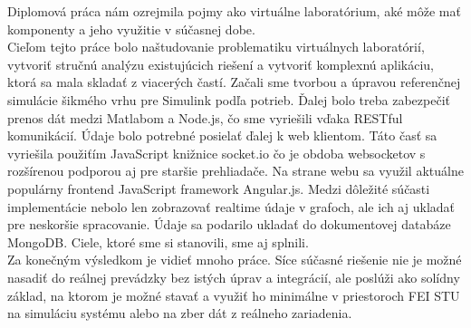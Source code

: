 \indent Diplomová práca nám ozrejmila pojmy ako virtuálne laboratórium, aké môže mať komponenty a jeho využitie v súčasnej dobe.\\
\indent Cieľom tejto práce bolo naštudovanie problematiku virtuálnych laboratórií, vytvoriť stručnú analýzu existujúcich riešení a vytvoriť komplexnú aplikáciu, ktorá sa mala skladať z viacerých častí. Začali sme tvorbou a úpravou referenčnej simulácie šikmého vrhu pre Simulink podľa potrieb. Ďalej bolo treba zabezpečiť prenos dát medzi Matlabom a Node.js, čo sme vyriešili vďaka RESTful komunikácií. Údaje bolo potrebné posielať ďalej k web klientom. Táto časť sa vyriešila použiťím JavaScript knižnice socket.io čo je obdoba websocketov s rozšírenou podporou aj pre staršie prehliadače. Na strane webu sa využil aktuálne populárny frontend JavaScript framework Angular.js. Medzi dôležité súčasti implementácie nebolo len zobrazovať realtime údaje v grafoch, ale ich aj ukladať pre neskoršie spracovanie. Údaje sa podarilo ukladať do dokumentovej databáze MongoDB.
Ciele, ktoré sme si stanovili, sme aj splnili.\\
\indent Za konečným výsledkom je vidieť mnoho práce. Síce súčasné riešenie nie je možné nasadiť do reálnej prevádzky bez istých úprav a integrácií, ale poslúži ako solídny základ, na ktorom je možné stavať a využiť ho minimálne v priestoroch FEI STU na simuláciu systému alebo na zber dát z reálneho zariadenia.
